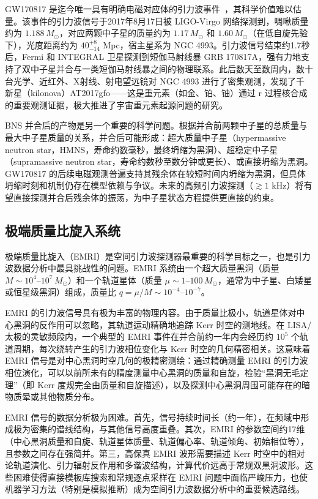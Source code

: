 GW170817 是迄今唯一具有明确电磁对应体的引力波事件~\cite{Abbott2017GW170817}，其科学价值难以估量。该事件的引力波信号于2017年8月17日被 LIGO-Virgo 网络探测到，啁啾质量约为 $1.188\,M_\odot$，对应两颗中子星的质量约为 $1.17\,M_\odot$ 和 $1.60\,M_\odot$（在低自旋先验下），光度距离约为 $40^{+8}_{-14}$ Mpc，宿主星系为 NGC 4993。引力波信号结束约1.7秒后，Fermi 和 INTEGRAL 卫星探测到短伽马射线暴 GRB 170817A，强有力地支持了双中子星并合与一类短伽马射线暴之间的物理联系。此后数天至数周内，数十台光学、近红外、X射线、射电望远镜对 NGC 4993 进行了密集观测，发现了千新星（kilonova）AT2017gfo——这是重元素（如金、铂、铀）通过 r 过程核合成的重要观测证据，极大推进了宇宙重元素起源问题的研究。

BNS 并合后的产物是另一个重要的科学问题。根据并合前两颗中子星的总质量与最大中子星质量的关系，并合后可能形成：超大质量中子星（hypermassive neutron star，HMNS，寿命约数毫秒，最终坍缩为黑洞）、超稳定中子星（supramassive neutron star，寿命约数秒至数分钟或更长）、或直接坍缩为黑洞。GW170817 的后续电磁观测普遍支持其残余体在较短时间内坍缩为黑洞，但具体坍缩时刻和机制仍存在模型依赖与争议。未来的高频引力波探测（$\gtrsim 1$ kHz）将有望直接探测并合后残余体的振荡，为中子星状态方程提供更直接的约束。

\subsection{极端质量比旋入系统}

极端质量比旋入（EMRI）是空间引力波探测器最重要的科学目标之一，也是引力波数据分析中最具挑战性的问题。EMRI 系统由一个超大质量黑洞（质量 $M \sim 10^4$--$10^7\,M_\odot$）和一个轨道星体（质量 $\mu \sim 1$--$100\,M_\odot$，通常为中子星、白矮星或恒星级黑洞）组成，质量比 $q = \mu/M \sim 10^{-4}$--$10^{-7}$。

EMRI 的引力波信号具有极为丰富的物理内容。由于质量比极小，轨道星体对中心黑洞的反作用可以忽略，其轨道运动精确地追踪 Kerr 时空的测地线。在 LISA/太极的灵敏频段内，一个典型的 EMRI 事件在并合前约一年内会经历约 $10^5$ 个轨道周期，每次绕转产生的引力波相位变化与 Kerr 时空的几何精密相关。这意味着 EMRI 信号是对中心黑洞时空几何的极精密测绘：通过精确测量 EMRI 的引力波相位演化，可以以前所未有的精度测量中心黑洞的质量和自旋，检验“黑洞无毛定理”（即 Kerr 度规完全由质量和自旋描述），以及探测中心黑洞周围可能存在的暗物质晕或其他物质分布。

EMRI 信号的数据分析极为困难。首先，信号持续时间长（约一年），在频域中形成极为密集的谱线结构，与其他信号高度重叠。其次，EMRI 的参数空间约17维（中心黑洞质量和自旋、轨道星体质量、轨道偏心率、轨道倾角、初始相位等），且参数之间存在强简并。第三，高保真 EMRI 波形需要描述 Kerr 时空中的相对论轨道演化、引力辐射反作用和多谐波结构，计算代价远高于常规双黑洞波形。这些困难使得直接模板库搜索和常规逐点采样在 EMRI 问题中面临严峻压力，也使机器学习方法（特别是模拟推断）成为空间引力波数据分析中的重要候选路线。

